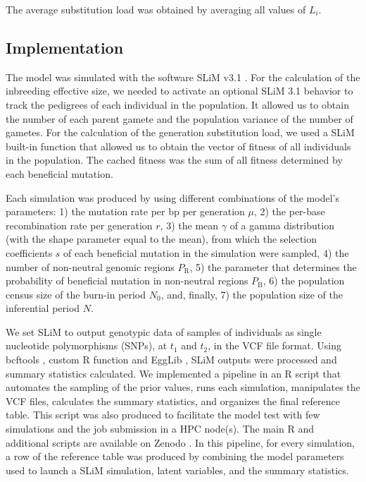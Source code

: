 \documentclass[a4paper, 12pt]{article}
\begin{document}
\noindent The average substitution load was obtained by averaging all values of $L_{i}$.

\subsection*{Implementation}

The model was simulated with the software SLiM v3.1 \citep{Haller:2017gm, Haller:2019fd}. For the calculation of the inbreeding effective size, we needed to activate an optional SLiM 3.1 behavior to track the pedigrees of each individual in the population. It allowed us to obtain the number of each parent gamete and the population variance of the number of gametes. For the calculation of the generation substitution load, we used a SLiM built-in function that allowed us to obtain the vector of fitness of all individuals in the population. The cached fitness was the sum of all fitness determined by each beneficial mutation. 

Each simulation was produced by using different combinations of the model's parameters: 1) the mutation rate per bp per generation $\mu$, 2) the per-base recombination rate per generation $r$, 3) the mean $\gamma$ of a gamma distribution (with the shape parameter equal to the mean), from which the selection coefficients $s$ of each beneficial mutation in the simulation were sampled, 4) the number of non-neutral genomic regions $P_\mathrm{R}$, 5) the parameter that determines the probability of beneficial mutation in non-neutral regions $P_\mathrm{B}$, 6) the population census size of the burn-in period $N_\mathrm{0}$, and, finally, 7) the population size of the inferential period $N$.

We set SLiM to output genotypic data of samples of individuals as single nucleotide polymorphisms (SNPs), at $t_1$ and $t_2$, in the VCF file format. Using bcftools \citep{Li:2011kr}, custom R function \citep{Rcore} and EggLib \citep{DeMita:2012dx}, SLiM outputs were processed and summary statistics calculated. We implemented a pipeline in an R script that automates the sampling of the prior values, runs each simulation, manipulates the VCF files, calculates the summary statistics, and organizes the final reference table. This script was also produced to facilitate the model test with few simulations and the job submission in a HPC node(s). The main R and additional scripts are available on Zenodo \citep{Pavinato:2021}. In this pipeline, for every simulation, a row of the reference table was produced by combining the model parameters used to launch a SLiM simulation, latent variables, and the summary statistics. 
\end{document}
